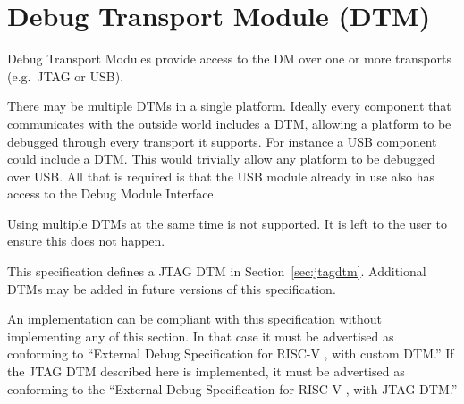 \chapter{Debug Transport Module (DTM)} \label{dtm}

Debug Transport Modules provide access to the DM over one or more transports
(e.g.\ JTAG or USB).

There may be multiple DTMs in a single platform. Ideally every component that
communicates with the outside world includes a DTM, allowing a platform to be
debugged through every transport it supports.  For instance a USB component
could include a DTM. This would trivially allow any platform to be debugged
over USB. All that is required is that the USB module already in use also has
access to the Debug Module Interface.

Using multiple DTMs at the same time is not supported. It is left to the user
to ensure this does not happen.

This specification defines a JTAG DTM in Section~\ref{sec:jtagdtm}. Additional DTMs
may be added in future versions of this specification.

An implementation can be compliant with this specification without implementing
any of this section. In that case it must be advertised as conforming to
``External Debug Specification for RISC-V \versionnum, with custom DTM.'' If the JTAG DTM
described here is implemented, it must be advertised as conforming to the
``External Debug Specification for RISC-V \versionnum, with JTAG DTM.''


